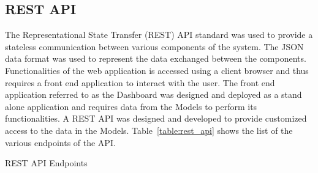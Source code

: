\subsection{REST API}
The Representational State Transfer (REST) API standard was used to provide a stateless communication between various components of the system. 
The JSON data format was used to represent the data exchanged between the components. Functionalities of the web application is accessed using a 
client browser and thus requires a front end application to interact with the user. The front end application referred to as the Dashboard was
designed and deployed as a stand alone application and requires data from the Models to perform its functionalities. A REST API was designed and 
developed to provide customized access to the data in the Models. 
Table~\ref{table:rest_api} shows the list of the various endpoints of the API. 

\begin{table}
    \centering
    \caption{REST API Endpoints}
    \label{table:rest_api}
    \end{table}


